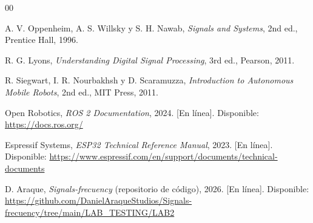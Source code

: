 
\begin{thebibliography}{00}

A. V. Oppenheim, A. S. Willsky y S. H. Nawab,
\textit{Signals and Systems},
2nd ed., Prentice Hall, 1996.

R. G. Lyons,
\textit{Understanding Digital Signal Processing},
3rd ed., Pearson, 2011.

R. Siegwart, I. R. Nourbakhsh y D. Scaramuzza,
\textit{Introduction to Autonomous Mobile Robots},
2nd ed., MIT Press, 2011.

Open Robotics,
\textit{ROS 2 Documentation},
2024. [En línea]. Disponible: \url{https://docs.ros.org/}

Espressif Systems,
\textit{ESP32 Technical Reference Manual},
2023. [En línea]. Disponible: \url{https://www.espressif.com/en/support/documents/technical-documents}

D. Araque,
\textit{Signals-frecuency} (repositorio de código),
2026. [En línea]. Disponible: \url{https://github.com/DanielAraqueStudios/Signals-frecuency/tree/main/LAB_TESTING/LAB2}

\end{thebibliography}
